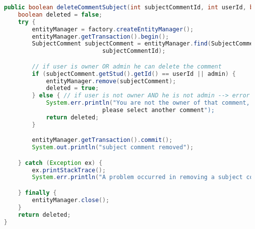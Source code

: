 \begin{lstlisting}[language=Java,  basicstyle=\footnotesize]
public boolean deleteCommentSubject(int subjectCommentId, int userId, boolean admin) {
	boolean deleted = false;
	try {
		entityManager = factory.createEntityManager();
		entityManager.getTransaction().begin();
		SubjectComment subjectComment = entityManager.find(SubjectComment.class,
							subjectCommentId);

		// if user is owner OR admin he can delete the comment
		if (subjectComment.getStud().getId() == userId || admin) {
			entityManager.remove(subjectComment);
			deleted = true;
		} else { // if user is not owner AND he is not admin --> error
			System.err.println("You are not the owner of that comment,
							please select another comment");
			return deleted;
		}

		entityManager.getTransaction().commit();
		System.out.println("subject comment removed");

	} catch (Exception ex) {
		ex.printStackTrace();
		System.err.println("A problem occurred in removing a subject comment!");

	} finally {
		entityManager.close();
	}
	return deleted;
}
\end{lstlisting}